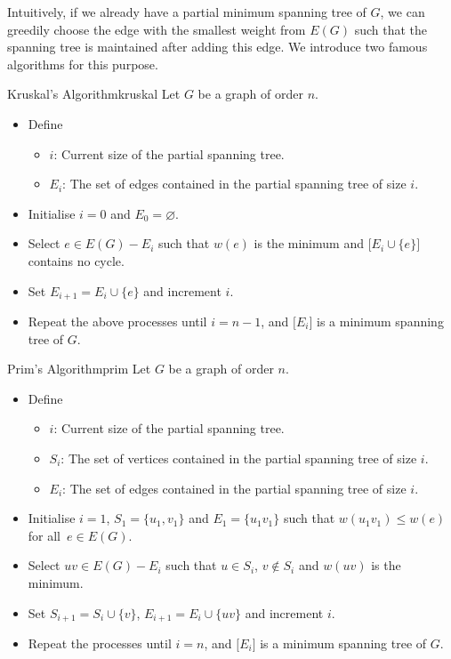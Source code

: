 \documentclass[math]{amznotes}
\theoremstyle{remark}
\begin{document}
Intuitively, if we already have a partial minimum spanning tree of $G$, we can greedily choose the edge with the smallest weight from $E(G)$ such that the spanning tree is maintained after adding this edge. We introduce two famous algorithms for this purpose.

\begin{tecbox}{Kruskal's Algorithm}{kruskal}
    Let $G$ be a graph of order $n$. 
    \begin{itemize}
        \item Define 
        \begin{itemize}
            \item $i$: Current size of the partial spanning tree.
            \item $E_i$: The set of edges contained in the partial spanning tree of size $i$.
        \end{itemize}
        \item Initialise $i = 0$ and $E_0 = \varnothing$.
        \item Select $e \in E(G) - E_i$ such that $w(e)$ is the minimum and $\bigl[E_i \cup \{e\}\bigr]$ contains no cycle.
        \item Set $E_{i + 1} = E_i \cup \{e\}$ and increment $i$.
        \item Repeat the above processes until $i = n - 1$, and $\bigl[E_i\bigr]$ is a minimum spanning tree of $G$.
    \end{itemize}
\end{tecbox}
\begin{tecbox}{Prim's Algorithm}{prim}
    Let $G$ be a graph of order $n$. 
    \begin{itemize}
        \item Define 
        \begin{itemize}
            \item $i$: Current size of the partial spanning tree.
            \item $S_i$: The set of vertices contained in the partial spanning tree of size $i$.
            \item $E_i$: The set of edges contained in the partial spanning tree of size $i$.
        \end{itemize}
        \item Initialise $i = 1$, $S_1 = \{u_1, v_1\}$ and $E_1 = \{u_1v_1\}$ such that $w(u_1v_1) \leq w(e)$ for all~$e \in E(G)$.
        \item Select $uv \in E(G) - E_i$ such that $u \in S_i$, $v\notin S_i$ and $w(uv)$ is the minimum.
        \item Set $S_{i + 1} = S_i \cup \{v\}$, $E_{i + 1} = E_i \cup \{uv\}$ and increment $i$.
        \item Repeat the processes until $i = n$, and $\bigl[E_i\bigr]$ is a minimum spanning tree of $G$.
    \end{itemize}
\end{tecbox}
\end{document}
